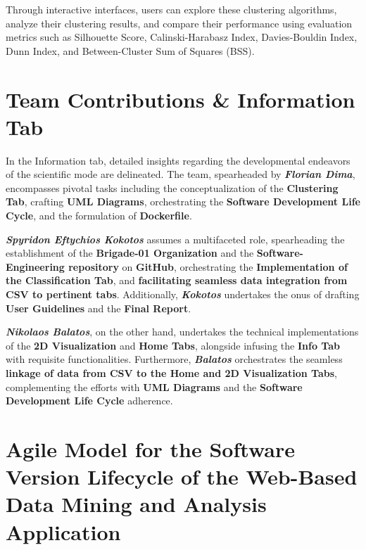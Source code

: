 \documentclass[unnumsec,webpdf,contemporary,large]{oup-authoring-template}%
\theoremstyle{thmstyleone}%
\theoremstyle{thmstyletwo}%
\theoremstyle{thmstylethree}%
\begin{document}
Through interactive interfaces, users can explore these clustering algorithms, analyze their clustering results, and compare their performance using evaluation metrics such as Silhouette Score, Calinski-Harabasz Index, Davies-Bouldin Index, Dunn Index, and Between-Cluster Sum of Squares (BSS).


\section{Team Contributions \& Information Tab}\label{sec3}
\vspace{0.2cm}

In the Information tab, detailed insights regarding the developmental endeavors of the scientific mode are delineated. The team, spearheaded by \textbf{\textit{Florian Dima}}, encompasses pivotal tasks including the conceptualization of the \textbf{Clustering Tab}, crafting \textbf{UML Diagrams}, orchestrating the \textbf{Software Development Life Cycle}, and the formulation of \textbf{Dockerfile}. 
\vspace{0.1cm}

\textbf{\textit{Spyridon Eftychios Kokotos}} assumes a multifaceted role, spearheading the establishment of the \textbf{Brigade-01 Organization} and the \textbf{Software-Engineering repository} on \textbf{GitHub}, orchestrating the \textbf{Implementation of the Classification Tab}, and \textbf{facilitating seamless data integration from CSV to pertinent tabs}. Additionally, \textbf{\textit{Kokotos}} undertakes the onus of drafting \textbf{User Guidelines} and the \textbf{Final Report}. 
\vspace{0.2cm}

\textbf{\textit{Nikolaos Balatos}}, on the other hand, undertakes the technical implementations of the \textbf{2D Visualization} and \textbf{Home Tabs}, alongside infusing the \textbf{Info Tab} with requisite functionalities. Furthermore, \textbf{\textit{Balatos}} orchestrates the seamless \textbf{linkage of data from CSV to the Home and 2D Visualization Tabs}, complementing the efforts with \textbf{UML Diagrams} and the \textbf{Software Development Life Cycle} adherence.
\vspace{0.2cm}

\section{Agile Model for the Software Version Lifecycle of the Web-Based Data Mining and Analysis Application}
\vspace{0.2cm}
\end{document}
